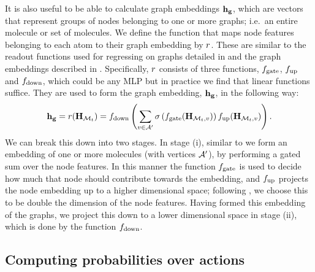 It is also useful to be able to calculate graph embeddings $\mathbf{h_g}$, which are vectors that represent groups of nodes belonging to one or more graphs; i.e.\ an entire molecule or set of molecules.
 We define the function that maps node features belonging to each atom to their graph embedding by $r$.
These are similar to the readout functions used for regressing on graphs detailed in \citep[Eq. 3]{gilmer2017neural} and the graph embeddings described in \citet[\S B.1]{li2018learning}. 
Specifically, $r$ consists of three functions, $f_\textrm{gate}$, $f_\textrm{up}$ and $f_\textrm{down}$, which could be any MLP but in practice we find that linear functions suffice. %
They are used to form the graph embedding, $\mathbf{h_g}$, in the following way:
\begin{align}
	\mathbf{h_g} = r({\mathbf{H}}_{{\mathcal{M}}_t}) = f_\textrm{down}\left(\sum_{v \in {\mathcal{A}}'} \sigma\left(f_\textrm{gate}({\mathbf{H}}_{{\mathcal{M}}_t,v})\right) f_\textrm{up}({\mathbf{H}}_{{\mathcal{M}}_t, v})\right).
	\label{eq:graph-embedding}
\end{align}
We can break this down into two stages.
In stage (i), similar to \citet[\S B.1]{li2018learning} we form an embedding of one or more molecules (with vertices ${\mathcal{A}}'$), by performing a gated sum over the node features.
In this manner the function $f_\textrm{gate}$ is used to decide how much that node should contribute towards the embedding,
 and $f_\textrm{up}$ projects the node embedding up to a higher dimensional space; following \citet[\S B.1]{li2018learning}, we choose this to be double the dimension of the node features.
Having formed this embedding of the graphs, we project this down to a lower dimensional space in stage (ii), which is done by the function $f_\textrm{down}$. 


\subsection{Computing probabilities over actions}

